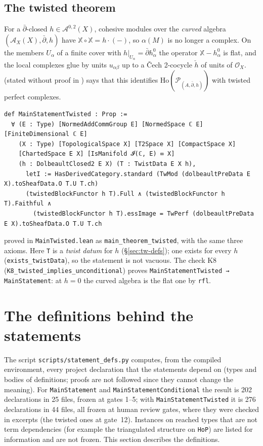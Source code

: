 \subsection{The twisted theorem}\label{sec:tw-statement}
For a ${\bar\partial}$-closed $h\in{\mathcal{A}}^{0,2}(X)$, cohesive modules over the \emph{curved} algebra
$({\mathcal{A}}_X(X),{\bar\partial},h)$ have ${\mathbb{X}}\circ{\mathbb{X}}=h\cdot(-)$, so $\alpha(M)$ is no longer a complex. On the
members $U_\alpha$ of a finite cover with $h|_{U_\alpha}={\bar\partial} h^0_\alpha$ the operator
${\mathbb{X}}-h^0_\alpha$ is flat, and the local complexes glue by units $u_{\alpha\beta}$ up to a Čech
2-cocycle ${\check h}$ of units of ${\mathcal{O}}_X$. \cite[Thm~7.4.3]{A} (stated without proof in \cite[Thm~4.2.1]{B})
says that this identifies ${\mathrm{Ho}}(\mathcal P_{(A,{\bar\partial},h)})$ with twisted perfect complexes.
\begin{verbatim}
def MainStatementTwisted : Prop :=
  ∀ (E : Type) [NormedAddCommGroup E] [NormedSpace ℂ E] [FiniteDimensional ℂ E]
    (X : Type) [TopologicalSpace X] [T2Space X] [CompactSpace X]
    [ChartedSpace E X] [IsManifold 𝓘(ℂ, E) ∞ X]
    (h : DolbeaultClosed2 E X) (T : TwistData E X h),
      letI := HasDerivedCategory.standard (TwMod (dolbeaultPreData E X).toSheafData.O T.U T.ch)
      (twistedBlockFunctor h T).Full ∧ (twistedBlockFunctor h T).Faithful ∧
        (twistedBlockFunctor h T).essImage = TwPerf (dolbeaultPreData E X).toSheafData.O T.U T.ch
\end{verbatim}
proved in \texttt{MainTwisted.lean} as \texttt{main\_theorem\_twisted}, with the same three axioms.
Here \texttt{T} is a \emph{twist datum} for $h$ (\S\ref{sec:tw-defs}); one exists for every $h$
(\texttt{exists\_twistData}), so the statement is not vacuous. The check K8
(\texttt{K8\_twisted\_implies\_unconditional}) proves \texttt{MainStatementTwisted → MainStatement}:
at $h=0$ the curved algebra is the flat one by \texttt{rfl}.

\section{The definitions behind the statements}
The script \texttt{scripts/statement\_defs.py} computes, from the compiled environment, every
project declaration that the statements depend on (types and bodies of definitions; proofs are
not followed since they cannot change the meaning). For \texttt{MainStatement} and
\texttt{MainStatementConditional} the result is 202 declarations in 25 files, frozen at gates 1--5;
with \texttt{MainStatementTwisted} it is 276 declarations in 44 files, all frozen at human review gates,
where they were checked in excerpts (the twisted ones at gate~12). Instances on reached types that are not term dependencies (for
example the triangulated structure on \texttt{HoP}) are listed for information and are not frozen.
This section describes the definitions.

